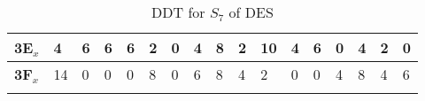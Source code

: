 \begin{longtable}[c]{|l|l|l|l|l|l|l|l|l|l|l|l|l|l|l|l|l|}
\textbf{3E$_x$} & 4              & 6              & 6              & 6              & 2              & 0              & 4              & 8              & 2              & 10             & 4              & 6              & 0              & 4              & 2              & 0              \\ \hline
\textbf{3F$_x$} & 14             & 0              & 0              & 0              & 8              & 0              & 6              & 8              & 4              & 2              & 0              & 0              & 4              & 8              & 4              & 6              \\ \hline
\caption{DDT for $S_7$ of DES}
\label{tab:ddt-s7-des}
\end{longtable}